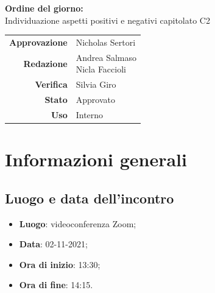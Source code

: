 \documentclass[11pt]{article}
\begin{document}
\begin{titlepage}
\begin{center}
			\large
			
			\vfill
			\textbf{Ordine del giorno:} \\
			Individuazione aspetti positivi e negativi capitolato C2
			\vfill
			
			\begin{tabular}{r|l}
				\textbf{Approvazione} &  Nicholas Sertori\\
				\textbf{Redazione} &  \parbox[t]{3.5cm}{Andrea Salmaso \\Nicla Faccioli}\\
				\textbf{Verifica} &  Silvia Giro\\
				\textbf{Stato} & Approvato \\
				\textbf{Uso} & Interno
			\end{tabular}
			\vfill
			
		\end{center}
	\end{titlepage}

	\newpage

	\section{Informazioni generali}
	\subsection{Luogo e data dell'incontro}
	\begin{itemize}
		\item \textbf{Luogo}: videoconferenza Zoom;
		\item \textbf{Data}: 02-11-2021;
		\item \textbf{Ora di inizio}: 13:30;
		\item \textbf{Ora di fine}: 14:15.
	\end{itemize}
	
\end{document}
